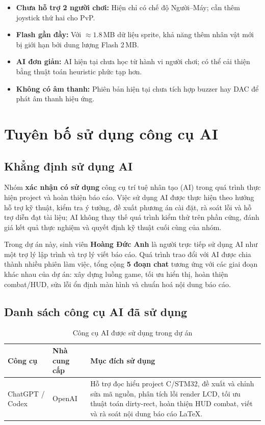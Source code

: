 \documentclass[a4paper,12pt]{report}
\begin{document}
\begin{itemize}
    \item \textbf{Chưa hỗ trợ 2 người chơi:} Hiện chỉ có chế độ Người--Máy; cần thêm joystick thứ hai cho PvP.
    \item \textbf{Flash gần đầy:} Với $\approx 1.8$\,MB dữ liệu sprite, khả năng thêm nhân vật mới bị giới hạn bởi dung lượng Flash 2\,MB.
    \item \textbf{AI đơn giản:} AI hiện tại chưa học từ hành vi người chơi; có thể cải thiện bằng thuật toán heuristic phức tạp hơn.
    \item \textbf{Không có âm thanh:} Phiên bản hiện tại chưa tích hợp buzzer hay DAC để phát âm thanh hiệu ứng.
\end{itemize}

\chapter{Tuyên bố sử dụng công cụ AI}

\section{Khẳng định sử dụng AI}

Nhóm \textbf{xác nhận có sử dụng} công cụ trí tuệ nhân tạo (AI) trong quá trình thực hiện project và hoàn thiện báo cáo. Việc sử dụng AI được thực hiện theo hướng hỗ trợ kỹ thuật, kiểm tra ý tưởng, đề xuất phương án cài đặt, rà soát lỗi và hỗ trợ diễn đạt tài liệu; AI không thay thế quá trình kiểm thử trên phần cứng, đánh giá kết quả thực nghiệm và quyết định kỹ thuật cuối cùng của nhóm.

Trong dự án này, sinh viên \textbf{Hoàng Đức Anh} là người trực tiếp sử dụng AI như một trợ lý lập trình và trợ lý viết báo cáo. Quá trình trao đổi với AI được chia thành nhiều phiên làm việc, tổng cộng \textbf{5 đoạn chat} tương ứng với các giai đoạn khác nhau của dự án: xây dựng luồng game, tối ưu hiển thị, hoàn thiện combat/HUD, sửa lỗi ổn định màn hình và chuẩn hoá nội dung báo cáo.

\section{Danh sách công cụ AI đã sử dụng}

\begin{table}[H]
\centering
\caption{Công cụ AI được sử dụng trong dự án}
\begin{tabular}{l l p{7cm}}
\toprule
\textbf{Công cụ} & \textbf{Nhà cung cấp} & \textbf{Mục đích sử dụng} \\
\midrule
ChatGPT / Codex & OpenAI & Hỗ trợ đọc hiểu project C/STM32, đề xuất và chỉnh sửa mã nguồn, phân tích lỗi render LCD, tối ưu thuật toán dirty-rect, hoàn thiện HUD combat, viết và rà soát nội dung báo cáo LaTeX. \\
\bottomrule
\end{tabular}
\end{table}
\end{document}
